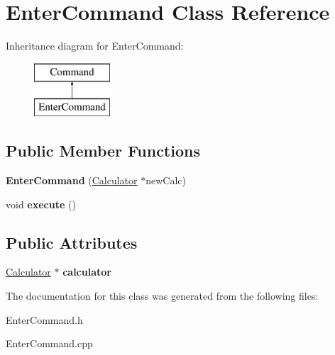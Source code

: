 \hypertarget{class_enter_command}{}\section{Enter\+Command Class Reference}
\label{class_enter_command}
Inheritance diagram for Enter\+Command\+:\begin{figure}[H]
\begin{center}
\leavevmode
\includegraphics[height=2.000000cm]{class_enter_command}
\end{center}
\end{figure}
\subsection*{Public Member Functions}
\begin{DoxyCompactItemize}
\item 
\hypertarget{class_enter_command_aa582c411b3919835a7ff06ec5f089a66}{}{\bfseries Enter\+Command} (\hyperlink{class_calculator}{Calculator} $\ast$new\+Calc)\label{class_enter_command_aa582c411b3919835a7ff06ec5f089a66}

\item 
\hypertarget{class_enter_command_ae8701c3ea3682f566dfbcd3415a767f8}{}void {\bfseries execute} ()\label{class_enter_command_ae8701c3ea3682f566dfbcd3415a767f8}

\end{DoxyCompactItemize}
\subsection*{Public Attributes}
\begin{DoxyCompactItemize}
\item 
\hypertarget{class_enter_command_a565ba3ebfd7b06dcd5fd30baa806f798}{}\hyperlink{class_calculator}{Calculator} $\ast$ {\bfseries calculator}\label{class_enter_command_a565ba3ebfd7b06dcd5fd30baa806f798}

\end{DoxyCompactItemize}


The documentation for this class was generated from the following files\+:\begin{DoxyCompactItemize}
\item 
Enter\+Command.\+h\item 
Enter\+Command.\+cpp\end{DoxyCompactItemize}
